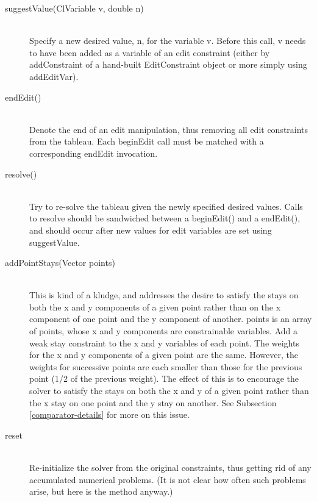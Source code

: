 \documentclass{article}
\begin{document}
\begin{description}
\item[{\sf suggestValue(ClVariable v, double n)}] \ \\
      Specify a new desired value, {\sf n}, for the variable {\sf v}.
      Before this call, {\sf v} needs to have been added as a variable
      of an edit constraint (either by {\sf addConstraint} of a
      hand-built {\sf EditConstraint} object or more simply using {\sf
        addEditVar}).
      

\item[{\sf endEdit()}] \ \\
      Denote the end of an edit manipulation, thus removing all edit
      constraints from the tableau.  Each {\sf beginEdit} call must be
      matched with a corresponding {\sf endEdit} invocation.

\item[{\sf resolve()}] \ \\
Try to re-solve the tableau given the newly specified desired values.
Calls to resolve should be sandwiched between a {\sf beginEdit()} and a
{\sf endEdit()}, and should occur after new values for edit variables
are set using {\sf suggestValue}.

\item[{\sf addPointStays(Vector points)}] \ \\
This is kind of a kludge, and addresses the desire to satisfy the stays
on both the {\sf x} and {\sf y} components of a given point rather than
on the {\sf x} component of one point and the {\sf y} component of another.
{\sf points} is an array of points, whose {\sf x} and {\sf y} components
are constrainable variables.  Add a weak stay constraint to the {\sf x}
and {\sf y} variables of each point.  The weights for the {\sf x} and
{\sf y} components of a given point are the same.  However, the weights
for successive points are each smaller than those for the previous
point (1/2 of the previous weight).  The effect of this is to encourage the
solver to satisfy the stays on both the {\sf x} and {\sf y} of a given
point rather than the {\sf x} stay on one point and the {\sf y} stay on
another.  See Subsection \ref{comparator-details} for more on this issue.

\item[{\sf reset}] \ \\
Re-initialize the solver from the original constraints,
thus getting rid of any accumulated numerical problems.  (It is not clear
how often such problems arise, but here is the method anyway.)

\end{description}
\end{document}
